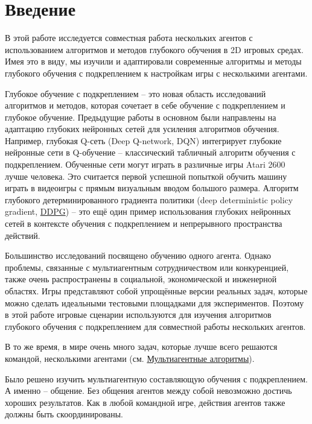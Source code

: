 \chapter*{Введение} \label{intro}%

В этой работе исследуется совместная работа нескольких агентов с использованием алгоритмов и методов глубокого обучения в 2D игровых средах. Имея это в виду, мы изучили и адаптировали современные алгоритмы и методы глубокого обучения с подкреплением к настройкам игры с несколькими агентами.

Глубокое обучение с подкреплением -- это новая область исследований алгоритмов и методов, которая сочетает в себе обучение с подкреплением и глубокое обучение. Предыдущие работы в основном были направлены на адаптацию глубоких нейронных сетей для усиления алгоритмов обучения. Например, глубокая Q-сеть (Deep Q-network, DQN) \cite{Mnih2015} интегрирует глубокие нейронные сети в Q-обучение -- классический табличный алгоритм обучения с подкреплением. Обученные сети могут играть в различные игры Atari 2600 \cite{Bellemare_2013} лучше человека. Это считается первой успешной попыткой обучить машину играть в видеоигры с прямым визуальным вводом большого размера. Алгоритм глубокого детерминированного градиента политики (deep deterministic policy gradient, \hyperref[acr:ddpg]{DDPG}) \cite{lillicrap2015continuous} -- это ещё один пример использования глубоких нейронных сетей в контексте обучения с подкреплением и непрерывного пространства действий.

Большинство исследований посвящено обучению одного агента. Однако проблемы, связанные с мультиагентным сотрудничеством или конкуренцией, также очень распространены в социальной, экономической и инженерной областях. Игры представляют собой упрощённые версии реальных задач, которые можно сделать идеальными тестовыми площадками для экспериментов. Поэтому в этой работе игровые сценарии используются для изучения алгоритмов глубокого обучения с подкреплением для совместной работы нескольких агентов.

В то же время, в мире очень много задач, которые лучше всего решаются командой, несколькими агентами (см. \hyperref[ch2:ma-algs]{Мультиагентные алгоритмы}).

Было решено изучить мультиагентную составляющую обучения с подкреплением. А именно -- общение. Без общения агентов между собой невозможно достичь хороших результатов. Как в любой командной игре, действия агентов также должны быть скоординированы.

